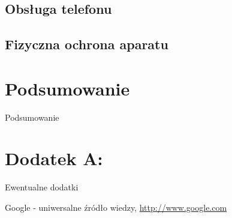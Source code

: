 \documentclass[journal]{IEEEtran}
\begin{document}
\subsection{Obsługa telefonu}



\subsection{Fizyczna ochrona aparatu}



\section{Podsumowanie}

Podsumowanie

\section{Dodatek A: }

Ewentualne dodatki


\begin{thebibliography}{123}
    Google - uniwersalne źródło wiedzy,
        \url{http://www.google.com}
\end{thebibliography}
\end{document}
